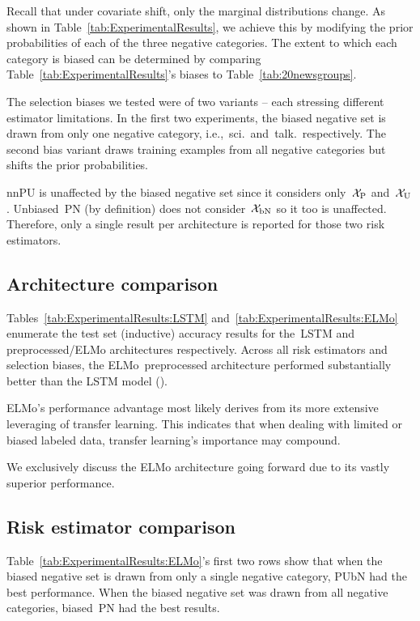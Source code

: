 Recall that under covariate shift, only the marginal distributions change.  As shown in Table~\eqref{tab:ExperimentalResults}, we achieve this by modifying the prior probabilities of each of the three negative categories.  The extent to which each category is biased can be determined by comparing Table~\ref{tab:ExperimentalResults}'s biases to Table~\ref{tab:20newsgroups}.

The selection biases we tested were of two variants -- each stressing different estimator limitations.  In the first two experiments, the biased negative set is drawn from only one negative category, i.e.,~sci.\ and~talk.\ respectively.  The second bias variant draws training examples from all negative categories but shifts the prior probabilities.

nnPU is unaffected by the biased negative set since it considers only~$\mathcal{X}_{\textnormal{P}}$ and~$\mathcal{X}_{\textnormal{U}}$.  Unbiased~PN (by definition) does not consider~$\mathcal{X}_{\textnormal{bN}}$ so it too is unaffected.  Therefore, only a single result per architecture is reported for those two risk estimators.

\subsection{Architecture comparison}

Tables~\ref{tab:ExperimentalResults:LSTM} and~\ref{tab:ExperimentalResults:ELMo} enumerate the test set (inductive) accuracy results for the~LSTM and preprocessed\-/ELMo architectures respectively.  Across all risk estimators and selection biases, the ELMo~preprocessed architecture performed substantially better than the LSTM model ().

ELMo's performance advantage most likely derives from its more extensive leveraging of transfer learning.  This indicates that when dealing with limited or biased labeled data, transfer learning's importance may compound.

We exclusively discuss the ELMo architecture going forward due to its vastly superior performance.

\subsection{Risk estimator comparison}

Table~\ref{tab:ExperimentalResults:ELMo}'s first two rows show that when the biased negative set is drawn from only a single negative category, PUbN had the best performance.  When the biased negative set was drawn from all negative categories, biased~PN had the best results.

